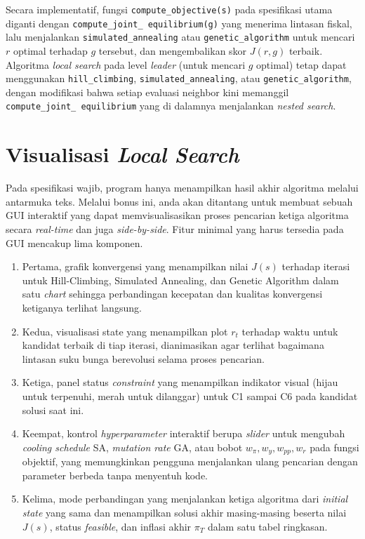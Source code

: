 Secara implementatif, fungsi \texttt{compute\_objective(s)} pada spesifikasi utama diganti dengan \texttt{compute\_joint\_ equilibrium(g)} yang menerima lintasan fiskal, lalu menjalankan \texttt{simulated\_annealing} atau \texttt{genetic\_algorithm} untuk mencari $r$ optimal terhadap $g$ tersebut, dan mengembalikan skor $J(r, g)$ terbaik. Algoritma \textit{local search} pada level \textit{leader} (untuk mencari $g$ optimal) tetap dapat menggunakan \texttt{hill\_climbing}, \texttt{simulated\_annealing}, atau \texttt{genetic\_algorithm}, dengan modifikasi bahwa setiap evaluasi neighbor kini memanggil \texttt{compute\_joint\_ equilibrium} yang di dalamnya menjalankan \textit{nested search}.


\section{Visualisasi \textit{Local Search}}

Pada spesifikasi wajib, program hanya menampilkan hasil akhir algoritma melalui antarmuka teks. Melalui bonus ini, anda akan ditantang untuk membuat sebuah GUI interaktif yang dapat memvisualisasikan proses pencarian ketiga algoritma secara \textit{real-time} dan juga \textit{side-by-side}. Fitur minimal yang harus tersedia pada GUI mencakup lima komponen.
\begin{enumerate}
    \item Pertama, grafik konvergensi yang menampilkan nilai $J(s)$ terhadap iterasi untuk Hill-Climbing, Simulated Annealing, dan Genetic Algorithm dalam satu \textit{chart} sehingga perbandingan kecepatan dan kualitas konvergensi ketiganya terlihat langsung.
    \item Kedua, visualisasi state yang menampilkan plot $r_t$ terhadap waktu untuk kandidat terbaik di tiap iterasi, dianimasikan agar terlihat bagaimana lintasan suku bunga berevolusi selama proses pencarian.
    \item Ketiga, panel status \textit{constraint} yang menampilkan indikator visual (hijau untuk terpenuhi, merah untuk dilanggar) untuk C1 sampai C6 pada kandidat solusi saat ini.
    \item  Keempat, kontrol \textit{hyperparameter} interaktif berupa \textit{slider} untuk mengubah \textit{cooling schedule} SA, \textit{mutation rate} GA, atau bobot $w_\pi, w_y, w_{pp}, w_r$ pada fungsi objektif, yang memungkinkan pengguna menjalankan ulang pencarian dengan parameter berbeda tanpa menyentuh kode.
    \item Kelima, mode perbandingan yang menjalankan ketiga algoritma dari \textit{initial state} yang sama dan menampilkan solusi akhir masing-masing beserta nilai $J(s)$, status \textit{feasible}, dan inflasi akhir $\pi_T$ dalam satu tabel ringkasan.
\end{enumerate}



